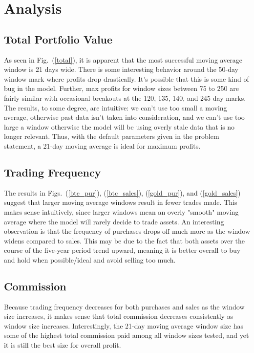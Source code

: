 \documentclass[12pt]{article}
\begin{document}
\section{Analysis}

\subsection{Total Portfolio Value}
As seen in Fig.\ (\ref{total}), it is apparent that the most successful moving average window is 21 days wide. 
There is some interesting behavior around the 50-day window mark where profits drop drastically. It's possible that this is some kind of bug in the model.
Further, max profits for window sizes between 75 to 250 are fairly similar with occasional breakouts at the 120, 135, 140, and 245-day marks.
The results, to some degree, are intuitive: we can't use too small a moving average, otherwise past data isn't taken into consideration, and we can't use too large a 
window otherwise the model will be using overly stale data that is no longer relevant. Thus, with the default parameters given in the problem statement, a 21-day moving average
is ideal for maximum profits.

\subsection{Trading Frequency}
The results in Figs.\ (\ref{btc_pur}), (\ref{btc_sales}), (\ref{gold_pur}), and (\ref{gold_sales}) suggest that larger moving average windows
result in fewer trades made. This makes sense intuitively, since larger windows mean an overly "smooth" moving average where the model will rarely decide to trade assets.
An interesting observation is that the frequency of purchases drops off much more as the window widens compared to sales. This may be due to the fact that both assets over the course
of the five-year period trend upward, meaning it is better overall to buy and hold when possible/ideal and avoid selling too much.

\subsection{Commission}
Because trading frequency decreases for both purchases and sales as the window size increases, it makes sense that total commission decreases consistently as window size increases.
Interestingly, the 21-day moving average window size has some of the highest total commission paid among all window sizes tested, and yet it is still the best size for overall profit.
\end{document}

